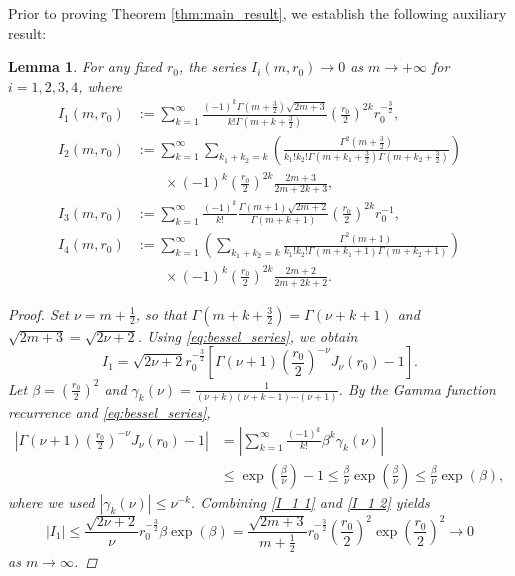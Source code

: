 \documentclass[11pt,reqno,oneside]{amsart}
\numberwithin{equation}{section}
\newtheorem{lemma}[theorem]{Lemma}
\theoremstyle{definition}
\theoremstyle{remark}
\numberwithin{equation}{section}
\begin{document}
	Prior to proving Theorem \ref{thm:main_result}, we establish the following auxiliary result:
	\begin{lemma}\label{I_1,I_2,I_3,I_4}
		For any fixed $r_0$, the series $I_{i}(m,r_0)\rightarrow 0$ as $m \rightarrow +\infty$ for $i=1,2,3,4$, where
		\begin{align*}
			I_1(m,r_0) &:= \sum_{k=1}^{\infty}\frac{(-1)^k\Gamma(m+\frac{3}{2})\sqrt{2m+3} }{k!\Gamma(m+k+\frac{3}{2})}\left(\frac{ r_0}{2}\right)^{2k}r_0^{-\frac{3}{2}}, \\
			I_2(m,r_0) &:= \sum_{k=1}^{\infty}\sum_{k_1+k_2=k}\left(\frac{\Gamma^2(m+\frac{3}{2})}{k_1!k_2!\Gamma(m+k_1+\frac{3}{2})\Gamma(m+k_2+\frac{3}{2})}\right)  \\
			& \qquad \times(-1)^k\left(\frac{ r_0}{2}\right)^{2k}\frac{2m+3}{2m+2k+3}, \\
			I_3(m,r_0) &:= \sum_{k=1}^{\infty}\frac{(-1)^k}{k!}\frac{\Gamma(m+1)\sqrt{2m+2}}{\Gamma(m+k+1)}\left(\frac{ r_0}{2}\right)^{2k}r^{-1}_0, \\
			I_4(m,r_0) &:= \sum_{k=1}^{\infty}\left(\sum_{k_1+k_2=k}\frac{\Gamma^{2}(m+1)}{k_1!k_2!\Gamma(m+k_1+1)\Gamma(m+k_2+1)}\right) \nonumber \\
			& \qquad \times(-1)^k\left(\frac{ r_0}{2}\right)^{2k}\frac{2m+2}{2m+2k+2}.
		\end{align*}
		\begin{proof}
			Set $\nu=m+\frac{1}{2}$, so that $\Gamma(m+k+\frac{3}{2})=\Gamma(\nu+k+1)$ and $\sqrt{2m+3}=\sqrt{2\nu+2}$. Using \eqref{eq:bessel_series}, we obtain
			\begin{equation}\label{I_1 1}
				I_1=\sqrt{2\nu +2} r_0^{-\frac{3}{2}}[\Gamma(\nu+1)(\frac{r_0}{2})^{-\nu}J_{\nu}(r_0)-1].
			\end{equation}
			Let $\beta=(\frac{r_0}{2})^2$ and $\gamma_k(\nu)=\frac{1}{(\nu+k)(\nu+k-1)\cdots(\nu+1)}$. By the Gamma function recurrence and \eqref{eq:bessel_series},
			\begin{equation}\label{I_1 2}
				\begin{aligned}
					|\Gamma(\nu+1)(\frac{r_0}{2})^{-\nu}J_{\nu}(r_0)-1|&=|\sum_{k=1}^{\infty}\frac{(-1)^k}{k!}\beta^k\gamma_k(\nu)|\\
					&\leqslant\exp(\frac{\beta}{\nu})-1\leqslant \frac{\beta}{\nu}\exp(\frac{\beta}{\nu})\leqslant \frac{\beta}{\nu}\exp(\beta),
				\end{aligned}
			\end{equation}
			where we used $|\gamma_k(\nu)|\leqslant \nu^{-k}$. Combining \eqref{I_1 1} and \eqref{I_1 2} yields
			\begin{equation*}
				|I_1|\leqslant \frac{\sqrt{2\nu +2}}{\nu} r_0^{-\frac{3}{2}}\beta\exp(\beta) =\frac{\sqrt{2m +3}}{m+\frac{1}{2}} r_0^{-\frac{3}{2}}(\frac{ r_0}{2})^2\exp(\frac{ r_0}{2})^2\rightarrow 0 
			\end{equation*}
			as $m \rightarrow \infty$.
			

\end{proof}
\end{lemma}
\end{document}
